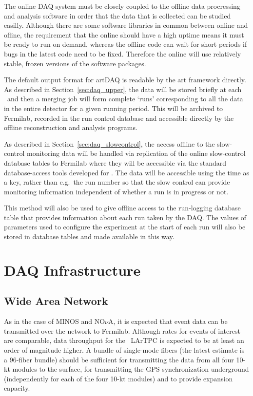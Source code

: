 The online DAQ system must be closely coupled to the offline data
procressing and analysis software in order that the data that is
collected can be studied easilly.  Although there are some software
libraries in common between online and ofline, the requirement that
the online should have a high uptime means it must be ready to run on
demand, whereas the offline code can wait for short periods if bugs in
the latest code need to be fixed.  Therefore the online will use
relatively stable, frozen versions of the software packages.

The default output format for artDAQ is readable by the art framework
directly.  As described in Section~\ref{sec:daq_upper}, the data will be
stored briefly at each \COMPARTMENT\ and then a merging job will form
complete `runs' corresponding to all the data in the entire detector
for a given running period.  This will be archived to Fermilab, recorded in the
run control database and accessible directly by the offline
reconstruction and analysis programs.

As described in Section~\ref{sec:daq_slowcontrol}, the access offline
to the slow-control monitoring data will be handled via replication of
the online slow-control database tables to Fermilab where they will be
accessible via the standard database-access tools developed for \LBNE.
The data will be accessible using the time as a key, rather than e.g.\
the run number so that the slow control can provide monitoring
information independent of whether a run is in progress or not.

This method will also be used to give offline access to the
run-logging database table that provides information about each run
taken by the DAQ.  The values of parameters used to configure the
experiment at the start of each run will also be stored in database
tables and made available in this way.

\section{DAQ Infrastructure }
\label{sec:daq_infrastructure}

\subsection{Wide Area Network}

As in the case of MINOS and NO$\nu$A, it is expected that event data
can be transmitted over the network to Fermilab.  Although rates for
events of interest are comparable, data throughput for the \LBNE\
LArTPC is expected to be at least an order of magnitude higher.  A
bundle of single-mode fibers (the latest estimate is a 96-fiber bundle)
should be sufficient for transmitting the data from all four 10-kt
modules to the surface, for transmitting the GPS synchronization
underground (independently for each of the four 10-kt modules) and to provide
expansion capacity.

